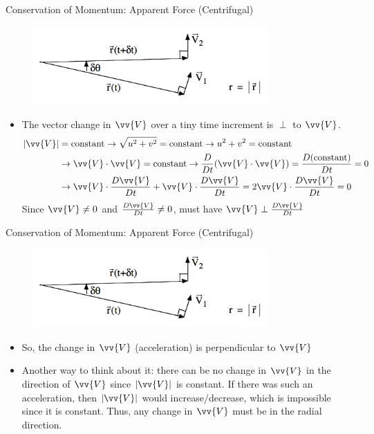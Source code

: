 \begin{frame}{Conservation of Momentum: Apparent Force (Centrifugal)}
\begin{figure}
		\includegraphics[width=0.8\textwidth]{centrifugal1}	
	\end{figure}
\begin{itemize}
	\item The vector change in $\vv{V}$ over a tiny time increment is $\perp$ to $\vv{V}$.
	\begin{align*}
	\left|\vv{V}\right| &= \text{constant} \rightarrow \sqrt{u^2 + v^2} = \text{constant} \rightarrow u^2 + v^2 = \text{constant}\\
	&\rightarrow \vv{V} \cdot \vv{V} = \text{constant} \rightarrow \frac{D}{Dt}(\vv{V} \cdot \vv{V}) = \frac{D(\text{constant})}{Dt} = 0\\
	&\rightarrow \vv{V}\cdot\frac{D\vv{V}}{Dt} + \vv{V}\cdot\frac{D\vv{V}}{Dt} = 2\vv{V}\cdot\frac{D\vv{V}}{Dt} = 0
	\end{align*}
	Since $\vv{V} \neq 0$ and $\frac{D\vv{V}}{Dt} \neq 0$, must have $\vv{V} \perp \frac{D\vv{V}}{Dt}$
\end{itemize}
\end{frame}
\begin{frame}{Conservation of Momentum: Apparent Force (Centrifugal)}
\begin{figure}
		\includegraphics[width=0.8\textwidth]{centrifugal1}	
	\end{figure}
\begin{itemize}
	\item So, the change in $\vv{V}$ (acceleration) is perpendicular to $\vv{V}$
	\item Another way to think about it: there can be no change in $\vv{V}$ in the direction of $\vv{V}$ since $\left|\vv{V}\right|$ is constant. If there was such an acceleration, then $\left|\vv{V}\right|$ would increase/decrease, which is impossible since it is constant. Thus, any change in $\vv{V}$ must be in the radial direction.
\end{itemize}
\end{frame}
